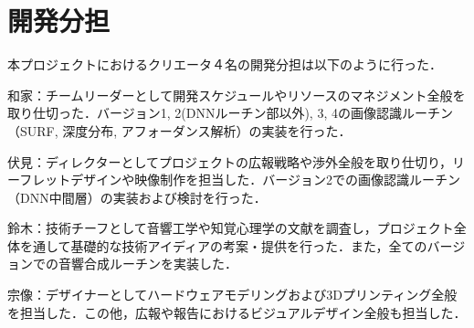 \section{開発分担}%
本プロジェクトにおけるクリエータ４名の開発分担は以下のように行った．

和家：チームリーダーとして開発スケジュールやリソースのマネジメント全般を取り仕切った．バージョン1, 2(DNNルーチン部以外), 3, 4の画像認識ルーチン（SURF, 深度分布, アフォーダンス解析）の実装を行った．

伏見：ディレクターとしてプロジェクトの広報戦略や渉外全般を取り仕切り，リーフレットデザインや映像制作を担当した．バージョン2での画像認識ルーチン（DNN中間層）の実装および検討を行った．

鈴木：技術チーフとして音響工学や知覚心理学の文献を調査し，プロジェクト全体を通して基礎的な技術アイディアの考案・提供を行った．また，全てのバージョンでの音響合成ルーチンを実装した．

宗像：デザイナーとしてハードウェアモデリングおよび3Dプリンティング全般を担当した．この他，広報や報告におけるビジュアルデザイン全般も担当した．

